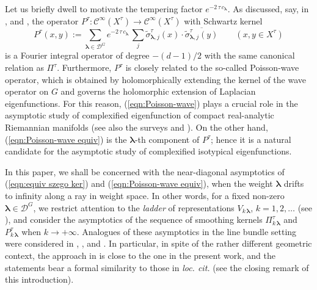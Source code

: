 \documentclass[12pt,a4paper]{article}
\theoremstyle{plain}
\theoremstyle{definition}
\begin{document}
Let us briefly dwell to motivate the tempering factor 
$e^{-2\,\tau\,c_{\boldsymbol{\lambda}}}$.
As discussed, say, in \cite{z12}, 
\cite{z14} and \cite{z20},
the operator $P^\tau:\mathcal{C}^\infty(X^\tau)\rightarrow
\mathcal{C}^\infty(X^\tau)$ with Schwartz kernel
\begin{equation}
\label{eqn:Poisson-wave}
P^\tau(x,y):=\sum_{\boldsymbol{\lambda}\in \mathcal{D}^G}
e^{-2\,\tau\,c_{\boldsymbol{\lambda}}}\,
\sum_j
\tilde{\sigma}_{\boldsymbol{\lambda},j}^\tau(x)
\cdot \overline{\tilde{\sigma}_{\boldsymbol{\lambda},j}^\tau(y)}
\qquad (x,y\in X^\tau)
\end{equation}
is a Fourier integral
operator of degree $-(d-1)/2$
with the same canonical relation as $\Pi^\tau$.
Furthermore, $P^\tau$ is closely related to the so-called Poisson-wave operator, which is
obtained by holomorphically extending the kernel
of the wave operator on $G$ and
governs the holomorphic extension of Laplacian eigenfunctions.
For this reason, (\ref{eqn:Poisson-wave}) plays a
crucial role in the asymptotic study of complexified eigenfunction of compact real-analytic Riemannian manifolds
(see also the surveys \cite{z13} and \cite{z17}).
On the other hand, (\ref{eqn:Poisson-wave equiv}) is the
$\boldsymbol{\lambda}$-th component of $P^\tau$; 
hence it is a natural candidate for the asymptotic study of
complexified isotypical eigenfunctions.

In this paper, we shall be concerned with the near-diagonal
asymptotics of (\ref{eqn:equiv szego ker}) and 
(\ref{eqn:Poisson-wave equiv}), when the weight
$\boldsymbol{\lambda}$ drifts to infinity along
a ray in weight space. 
%
In other words, for a fixed non-zero
$\boldsymbol{\lambda}\in \mathcal{D}^G$, 
we restrict attention to the
\textit{ladder} of representations 
$V_{k\,\boldsymbol{\lambda}}$, 
$k=1,2,\ldots$ (see \cite{gstb82}),
and consider the asymptotics of 
the sequence of smoothing kernels 
$\Pi^\tau_{k\,\boldsymbol{\lambda}}$ and 
$P^\tau_{k\,\boldsymbol{\lambda}}$ when $k\rightarrow +\infty$.
Analogues of these asymptotics in the line bundle setting were considered in \cite{gp19}, \cite{gp20},
and \cite{p22}. In particular, in spite of the rather different
geometric context, the approach in
\cite{p22} is close to the one in the present work,
and the statements bear a formal similarity to
those in \textit{loc. cit.} (see the closing remark of this
introduction).
\end{document}
